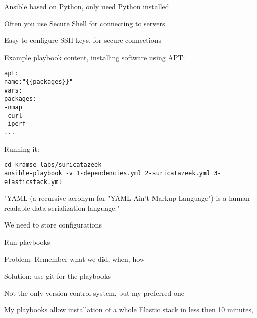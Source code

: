 \documentclass[Screen16to9,17pt]{foils}
\begin{document}


\begin{list2}
\item Ansible based on Python, only need Python installed\\
\item Often you use Secure Shell for connecting to servers\\
\item Easy to configure SSH keys, for secure connections
\end{list2}



Example playbook content, installing software using APT:
\begin{alltt}\small
apt:
    name: "\{\{ packages \}\}"
    vars:
      packages:
        - nmap
        - curl
        - iperf
        ...
\end{alltt}

Running it:
\begin{verbatim}
cd kramse-labs/suricatazeek
ansible-playbook -v 1-dependencies.yml 2-suricatazeek.yml 3-elasticstack.yml
\end{verbatim}

"YAML (a recursive acronym for "YAML Ain't Markup Language") is a human-readable data-serialization language."\\



\begin{list2}
\item We need to store configurations
\item Run playbooks
\item Problem: Remember what we did, when, how
\item Solution: use git for the playbooks
\item Not the only version control system, but my preferred one
\end{list2}



My playbooks allow installation of a whole Elastic stack in less then 10 minutes,
\end{document}
